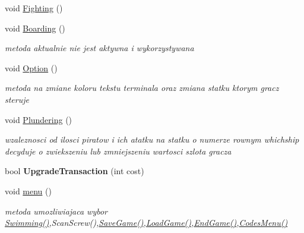 \begin{DoxyCompactItemize}
void \hyperlink{class_player_aea0f1b80c9c3e2ea3beede26b9b2b51a}{Fighting} ()
\item 
\mbox{\label{class_player_ac5e6adb315692e210db2293f846e5d40}} 
void \hyperlink{class_player_ac5e6adb315692e210db2293f846e5d40}{Boarding} ()
\begin{DoxyCompactList}\small\item\em metoda aktualnie nie jest aktywna i wykorzystywana \end{DoxyCompactList}\item 
\mbox{\label{class_player_aa1687475b3c27bd0bb904fe5033ea176}} 
void \hyperlink{class_player_aa1687475b3c27bd0bb904fe5033ea176}{Option} ()
\begin{DoxyCompactList}\small\item\em metoda na zmiane koloru tekstu terminala oraz zmiana statku ktorym gracz steruje \end{DoxyCompactList}\item 
\mbox{\label{class_player_ac2310aba7bab5049f6ff4c7b3392566e}} 
void \hyperlink{class_player_ac2310aba7bab5049f6ff4c7b3392566e}{Plundering} ()
\begin{DoxyCompactList}\small\item\em wzaleznosci od ilosci piratow i ich atatku na statku o numerze rownym whichship decyduje o zwiekszeniu lub zmniejszeniu wartosci szlota gracza \end{DoxyCompactList}\item 
\mbox{\label{class_player_a9e9d22a6d971e8b4618ba3d791f2b72f}} 
bool {\bfseries Upgrade\+Transaction} (int cost)
\item 
\mbox{\label{class_player_a90bf77e4e5c33089e3f8136a887ed63a}} 
void \hyperlink{class_player_a90bf77e4e5c33089e3f8136a887ed63a}{menu} ()
\begin{DoxyCompactList}\small\item\em metoda umozliwiajaca wybor \hyperlink{class_player_a254328ae8a844fcbc54fe6f159e02131}{Swimming()},Scan\+Screw(),\hyperlink{class_player_af3e4d935acf14a7f75af9e034c84c668}{Save\+Game()},\hyperlink{class_player_a8eaaa47114a8c0f3be2d81b3949ce728}{Load\+Game()},\hyperlink{class_player_ae73a73ebaf54a546d29cd76e95df1d88}{End\+Game()},\hyperlink{class_player_a28e5f8eafd2b969be00a75d9acde3693}{Codes\+Menu()} \end{DoxyCompactList}\item 

\end{DoxyCompactItemize}
